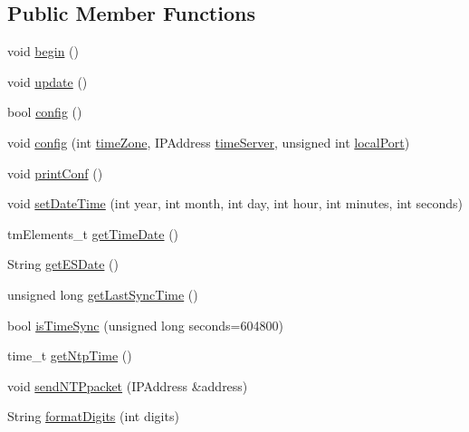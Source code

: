 \subsection*{Public Member Functions}
\begin{DoxyCompactItemize}
\item 
void \hyperlink{classCoolTime_ab1976cf718b950bc31e003c3323b8adb}{begin} ()
\item 
void \hyperlink{classCoolTime_aae601f795452cfa48d9fb337aed483a8}{update} ()
\item 
bool \hyperlink{classCoolTime_a87c28260c1bc77091162cbcf1ee2e129}{config} ()
\item 
void \hyperlink{classCoolTime_ae5528ed0ba9e78c711084968054950e0}{config} (int \hyperlink{classCoolTime_a1916d98810c2a4e9ba72867e8c1b9a99}{time\+Zone}, I\+P\+Address \hyperlink{classCoolTime_ad2b9858f399108cb440dd1e908916f04}{time\+Server}, unsigned int \hyperlink{classCoolTime_a2f777da44d7ba678be8185299e9b49d1}{local\+Port})
\item 
void \hyperlink{classCoolTime_af355e7f9b3898211cd2ff25eab5933b1}{print\+Conf} ()
\item 
void \hyperlink{classCoolTime_ab81ea7fdaace111aa01cc1ec84c6d297}{set\+Date\+Time} (int year, int month, int day, int hour, int minutes, int seconds)
\item 
tm\+Elements\+\_\+t \hyperlink{classCoolTime_a7a7501c5ca77dd1248bea704c44f986c}{get\+Time\+Date} ()
\item 
String \hyperlink{classCoolTime_ac4f32ee513c1328d984306645e8785a4}{get\+E\+S\+Date} ()
\item 
unsigned long \hyperlink{classCoolTime_a5d17f707a9d337720493b2bce9d41c21}{get\+Last\+Sync\+Time} ()
\item 
bool \hyperlink{classCoolTime_a5ae038a4498602b189f76a10bf02adf8}{is\+Time\+Sync} (unsigned long seconds=604800)
\item 
time\+\_\+t \hyperlink{classCoolTime_a41fbbbfd651c2079f54d4b2911e4c705}{get\+Ntp\+Time} ()
\item 
void \hyperlink{classCoolTime_a236a38d120dc53bc67456d763838c5a1}{send\+N\+T\+Ppacket} (I\+P\+Address \&address)
\item 
String \hyperlink{classCoolTime_acd537cd4210d7bde4e1f5c47d2ac0456}{format\+Digits} (int digits)
\end{DoxyCompactItemize}

